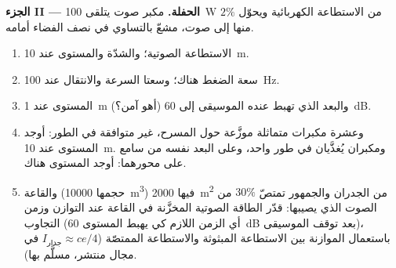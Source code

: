\begin{problem}
\medskip
\noindent\textbf{الجزء II --- الحفلة.}
مكبر صوت يتلقى \qty{100}{W} من الاستطاعة الكهربائية ويحوّل
$2\%$ منها إلى صوت، مشعّ بالتساوي في نصف الفضاء أمامه.
\begin{enumerate}[resume]
  \item الاستطاعة الصوتية؛ والشدّة والمستوى عند \qty{10}{m}.
  \item سعة الضغط هناك؛ وسعتا السرعة والانتقال
        عند \qty{100}{Hz}.
  \item المستوى عند \qty{1}{m} (أهو آمن؟) والبعد الذي تهبط عنده
        الموسيقى إلى \qty{60}{dB}.
  \item وعشرة مكبرات متماثلة موزَّعة حول المسرح، غير
        متوافقة في الطور: أوجد المستوى عند \qty{10}{m}. ومكبران يُغذَّيان في طور
        واحد، وعلى البعد نفسه من سامع على محورهما: أوجد المستوى هناك.
  \item والقاعة (حجمها \qty{10000}{m^3}) فيها \qty{2000}{m^2} من الجدران والجمهور تمتصّ $30\%$ من
        الصوت الذي يصيبها: قدّر الطاقة الصوتية المخزَّنة في
        القاعة عند التوازن وزمن التجاوب (أي الزمن اللازم كي
        يهبط المستوى \qty{60}{dB} بعد توقف الموسيقى)، باستعمال
        الموازنة بين الاستطاعة المبثوثة والاستطاعة الممتصّة
        ($I_{\text{جدار}} \approx ce/4$ في مجال منتشر، مسلَّم بها).
\end{enumerate}


\end{problem}
